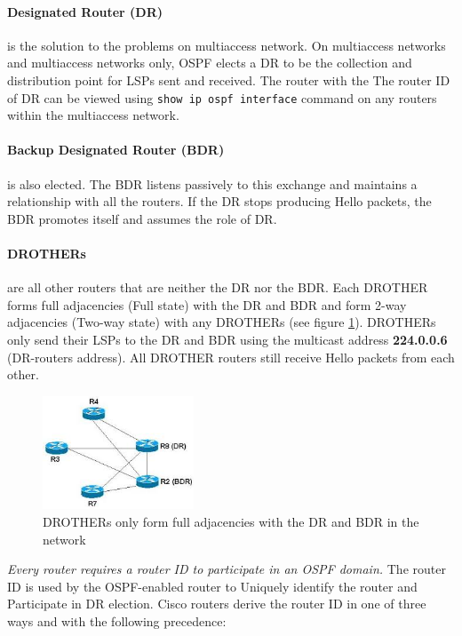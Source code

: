 \paragraph{Designated Router (DR)} is the solution to the problems on multiaccess network. On multiaccess networks and multiaccess networks only, OSPF elects a DR to be the collection and distribution point for LSPs sent and received. The router with the  The router ID of DR can be viewed using \texttt{show ip ospf interface} command on any routers within the multiaccess network.
	
\paragraph{Backup Designated Router (BDR)} is also elected. The BDR listens passively to this exchange and maintains a relationship with all the routers. If the DR stops producing Hello packets, the BDR promotes itself and assumes the role of DR.
	
\paragraph{DROTHERs} are all other routers that are neither the DR nor the BDR. Each DROTHER forms full adjacencies (Full state) with the DR and BDR and form 2-way adjacencies (Two-way state) with any DROTHERs (see figure \ref{DR-adjacency}). DROTHERs only send their LSPs to the DR and BDR using the multicast address \textbf{224.0.0.6} (DR-routers address). All DROTHER routers still receive Hello packets from each other.
	
\begin{figure}[hbtp]
\centering
\includegraphics[width=0.4\textwidth]{pictures/dr-bdr.jpeg}
\caption{DROTHERs only form full adjacencies with the DR and BDR in the network}
\label{DR-adjacency}
\end{figure}

\emph{Every router requires a router ID to participate in an OSPF domain.} The router ID is used by the OSPF-enabled router to Uniquely identify the router and Participate in DR election. Cisco routers derive the router ID in one of three ways and with the following precedence: 

